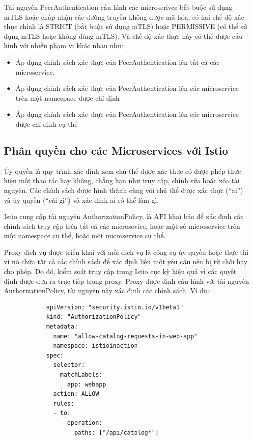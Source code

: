 \documentclass[12pt,a4paper]{report}
\begin{document}
{{			Tài nguyên PeerAuthentication cấu hình các microserivce bắt buộc sử dụng mTLS hoặc chấp nhận các đường truyền không được mã hóa, có hai chế độ xác thực chính là STRICT (bắt buộc sử dụng mTLS) hoặc PERMISSIVE (có thể sử dụng mTLS hoặc không dùng mTLS). Và chế độ xác thực này có thể được cấu hình với nhiều phạm vi khác nhau như:
			
			\begin{itemize}
				\item Áp dụng chính sách xác thực của PeerAuthentication lên tất cả các microservice.
				\item Áp dụng chính sách xác thực của PeerAuthentication lên các microservice trên một namespace được chỉ định
				\item Áp dụng chính sách xác thực của PeerAuthentication lên các microservice được chỉ định cụ thể
			\end{itemize}
			 
			
		\subsection{Phân quyền cho các Microservices với Istio}
			{\hspace{0.6cm}Ủy quyền là quy trình xác định xem chủ thể được xác thực có được phép thực hiện một thao tác hay không, chẳng hạn như truy cập, chỉnh sửa hoặc xóa tài nguyên. Các chính sách được hình thành cùng với chủ thể được xác thực (“ai”) và ủy quyền (“cái gì”) và xác định ai có thể làm gì.}
			
			Istio cung cấp tài nguyên AuthorizationPolicy, là API khai báo để xác định các chính sách truy cập trên tất cả các microsevice, hoặc một số microservice trên một namespace cụ thể, hoặc một microservice cụ thể.
			
			Proxy dịch vụ được triển khai với mỗi dịch vụ là công cụ ủy quyền hoặc thực thi vì nó chứa tất cả các chính sách để xác định liệu một yêu cầu nên bị từ chối hay cho phép. Do đó, kiểm soát truy cập trong Istio cực kỳ hiệu quả vì các quyết định được đưa ra trực tiếp trong proxy. Proxy được định cấu hình với tài nguyên AuthorizationPolicy, tài nguyên này xác định các chính sách. Ví dụ:
			
			\begin{lstlisting}
			apiVersion: "security.istio.io/v1beta1"
			kind: "AuthorizationPolicy"
			metadata:
			  name: "allow-catalog-requests-in-web-app"
			  namespace: istioinaction
			spec:
			  selector:
			    matchLabels:
				  app: webapp
			  action: ALLOW
			  rules:
			  - to:
				- operation:
				    paths: ["/api/catalog*"]
			\end{lstlisting}
			
}}
\end{document}
